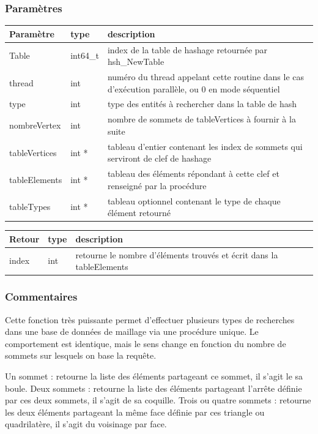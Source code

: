 \documentclass[a4paper,12pt]{article}
\begin{document}
\subsubsection*{Paramètres}
\begin{tabular}{|m{3cm}|m{2cm}|m{8.5cm}|}
\hline
Paramètre     & type     & description \\
\hline
Table         & int64\_t & index de la table de hashage retournée par hsh\_NewTable \\
\hline
thread        & int      & numéro du thread appelant cette routine dans le cas d'exécution parallèle, ou 0 en mode séquentiel \\
\hline
type          & int      & type des entités à rechercher dans la table de hash \\
\hline
nombreVertex  & int      & nombre de sommets de tableVertices à fournir à la suite \\
\hline
tableVertices & int *    & tableau d'entier contenant les index de sommets qui serviront de clef de hashage \\
\hline
tableElements & int *    & tableau des éléments répondant à cette clef et renseigné par la procédure \\
\hline
tableTypes    & int *    & tableau optionnel contenant le type de chaque élément retourné \\
\hline
\end{tabular}

\medskip

\begin{tabular}{|m{3cm}|m{2cm}|m{8.5cm}|}
\hline
Retour     & type   & description \\
\hline
index      & int    & retourne le nombre d'éléments trouvés et écrit dans la tableElements \\
\hline
\end{tabular}

\subsubsection*{Commentaires}
Cette fonction très puissante permet d'effectuer plusieurs types de recherches dans une base de données de maillage via une procédure unique.
Le comportement est identique, mais le sens change en fonction du nombre de sommets sur lesquels on base la requête.

Un sommet : retourne la liste des éléments partageant ce sommet, il s'agit le sa boule.
Deux sommets : retourne la liste des éléments partageant l'arrête définie par ces deux sommets, il s'agit de sa coquille.
Trois ou quatre sommets : retourne les deux éléments partageant la même face définie par ces triangle ou quadrilatère, il s'agit du voisinage par face.
\end{document}
